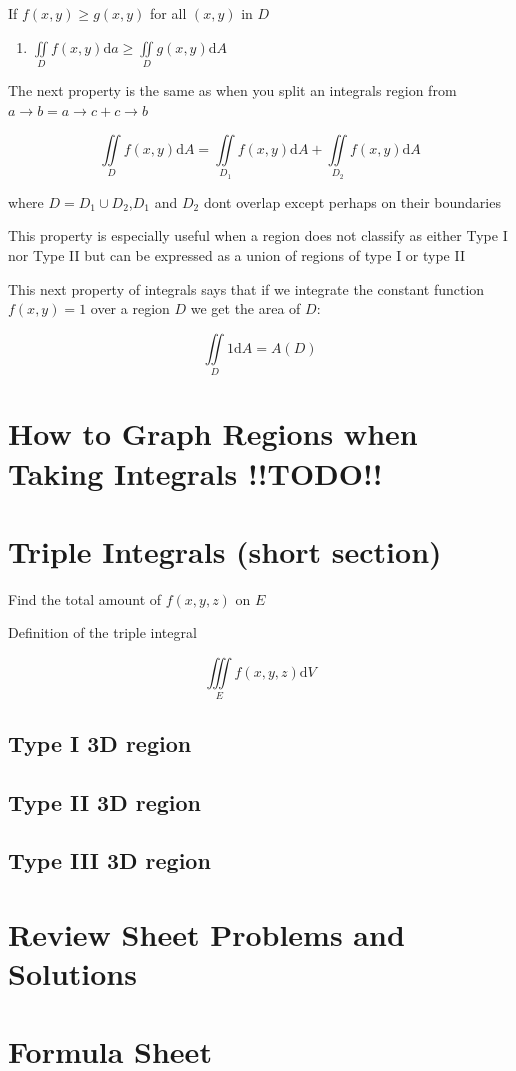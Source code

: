 \documentclass{article}
\begin{document}
If $f(x,y) \geq g(x,y)$ for all $(x,y)$ in $D$

\begin{enumerate}
    \item $\iint\limits_{D} f(x,y) \mathrm{d}a \geq \iint\limits_{D}g(x,y) \mathrm{d}A$
\end{enumerate}

The next property is the same as when you split an integrals region from $a \rightarrow b  = a \rightarrow c + c \rightarrow b$

$$\iint\limits_{D}f(x,y)\mathrm{d}A = \iint\limits_{D_1}f(x,y)\mathrm{d}A + \iint\limits_{D_2}f(x,y)\mathrm{d}A$$

where $D = D_1 \cup D_2 $,$D_1$ and $D_2$ dont overlap except perhaps on their boundaries

This property is especially useful when a region does not classify as either Type I nor Type II but can be expressed as a union of regions of type I or type II

This next property of integrals says that if we integrate the constant function $f(x,y) = 1$ over a region $D$ we get the area of $D$:

$$\iint\limits_{D}1\mathrm{d}A = A(D)$$

\newpage
\section{How to Graph Regions when Taking Integrals !!TODO!!}

\section{Triple Integrals (short section)}

    Find the total amount of $f(x,y,z)$ on $E$

    Definition of the triple integral

    $$\iiint\limits_{E}f(x,y,z)\mathrm{d}V$$

    \subsection{Type I 3D region}

    \subsection{Type II 3D region}

    \subsection{Type III 3D region}

\newpage
\section{Review Sheet Problems and Solutions}

\newpage
\section{Formula Sheet}
\end{document}
